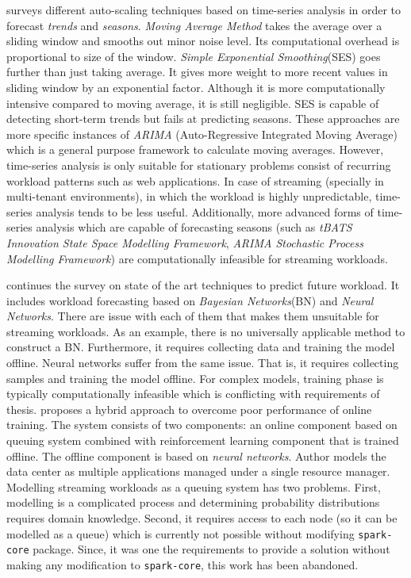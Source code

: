 \textcite{Herbst:2013} surveys different auto-scaling techniques based on time-series analysis in order to forecast \emph{trends} and \emph{seasons}. \emph{Moving Average Method} takes the average over a sliding window and smooths out minor noise level. Its computational overhead is proportional to size of the window. \emph{Simple Exponential Smoothing}(SES) goes further than just taking average. It gives more weight to more recent values in sliding window by an exponential factor. Although it is more computationally intensive compared to moving average, it is still negligible. SES is capable of detecting short-term trends but fails at predicting seasons. These approaches are more specific instances of \emph{ARIMA} (Auto-Regressive Integrated Moving Average) which is a general purpose framework to calculate moving averages. However, time-series analysis is only suitable for stationary problems consist of recurring workload patterns such as web applications. In case of streaming (specially in multi-tenant environments), in which the workload is highly unpredictable, time-series analysis tends to be less useful. Additionally, more advanced forms of time-series analysis which are capable of forecasting seasons (such as \emph{tBATS Innovation State Space Modelling Framework}\cite{Alysha2011}, \emph{ARIMA Stochastic Process Modelling Framework}\cite{JSSv027i03}) are computationally infeasible for streaming workloads. \newline

\textcite{Herbst:2017} continues the survey on state of the art techniques to predict future workload. It includes workload forecasting based on \emph{Bayesian Networks}(BN) and \emph{Neural Networks}. There are issue with each of them that makes them unsuitable for streaming workloads. As an example, there is no universally applicable method to construct a BN. Furthermore, it requires collecting data and training the model offline. Neural networks suffer from the same issue. That is, it requires collecting samples and training the model offline. For complex models, training phase is typically computationally infeasible which is conflicting with requirements of thesis.
\newpage
\textcite{Tesauro2006} proposes a hybrid approach to overcome poor performance of online training. The system consists of two components: an online component based on queuing system combined with reinforcement learning component that is trained offline. The offline component is based on \emph{neural networks}. Author models the data center as multiple applications managed under a single resource manager. Modelling streaming workloads as a queuing system has two problems. First, modelling is a complicated process and determining probability distributions requires domain knowledge. Second, it requires access to each node (so it can be modelled as a queue) which is currently not possible without modifying \lstinline$spark-core$ package. Since, it was one the requirements to provide a solution without making any modification to \lstinline$spark-core$, this work has been abandoned.\newline

